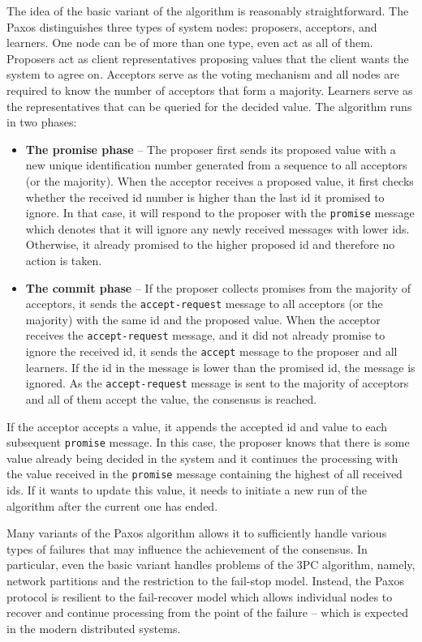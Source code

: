 \documentclass[oneside,
  digital, %
  table,   %
  lof,     %
  lot,     %
]{fithesis3}
\begin{document}
The idea of the basic variant of the algorithm is reasonably straightforward. The Paxos distinguishes three types of system nodes: proposers, acceptors, and learners. One node can be of more than one type, even act as all of them. Proposers act as client representatives proposing values that the client wants the system to agree on. Acceptors serve as the voting mechanism and all nodes are required to know the number of acceptors that form a majority. Learners serve as the representatives that can be queried for the decided value. The algorithm runs in two phases:

\begin{itemize}
    \item \textbf{The promise phase} -- The proposer first sends its proposed value with a new unique identification number generated from a sequence to all acceptors (or the majority). When the acceptor receives a proposed value, it first checks whether the received id number is higher than the last id it promised to ignore. In that case, it will respond to the proposer with the \texttt{promise} message which denotes that it will ignore any newly received messages with lower ids. Otherwise, it already promised to the higher proposed id and therefore no action is taken.
    
    \item \textbf{The commit phase} -- If the proposer collects promises from the majority of acceptors, it sends the \texttt{accept-request} message to all acceptors (or the majority) with the same id and the proposed value. When the acceptor receives the \texttt{accept-request} message, and it did not already promise to ignore the received id, it sends the \texttt{accept} message to the proposer and all learners. If the id in the message is lower than the promised id, the message is ignored. As the \texttt{accept-request} message is sent to the majority of acceptors and all of them accept the value, the consensus is reached.
\end{itemize}

If the acceptor accepts a value, it appends the accepted id and value to each subsequent \texttt{promise} message. In this case, the proposer knows that there is some value already being decided in the system and it continues the processing with the value received in the \texttt{promise} message containing the highest of all received ids. If it wants to update this value, it needs to initiate a new run of the algorithm after the current one has ended. 

Many variants of the Paxos algorithm allows it to sufficiently handle various types of failures that may influence the achievement of the consensus. In particular, even the basic variant handles problems of the 3PC algorithm, namely, network partitions and the restriction to the fail-stop model. Instead, the Paxos protocol is resilient to the fail-recover model which allows individual nodes to recover and continue processing from the point of the failure -- which is expected in the modern distributed systems.
\end{document}
